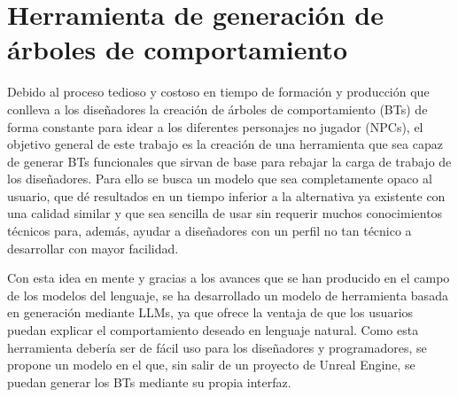 \chapter{Herramienta de generación de árboles de comportamiento}
\label{cap:descripcionTrabajo}


% 
% 
% 
% 
% 
% 

Debido al proceso tedioso y costoso en tiempo de formación y producción que conlleva a los diseñadores la creación de árboles de comportamiento (BTs) de forma constante para idear a los diferentes personajes no jugador (NPCs), el objetivo general de este trabajo es la creación de una herramienta que sea capaz de generar BTs funcionales que sirvan de base para rebajar la carga de trabajo de los diseñadores.
Para ello se busca un modelo que sea completamente opaco al usuario, que dé resultados en un tiempo inferior a la alternativa ya existente con una calidad similar y que sea sencilla de usar sin requerir muchos conocimientos técnicos para, además, ayudar a diseñadores con un perfil no tan técnico a desarrollar con mayor facilidad.

Con esta idea en mente y gracias a los avances que se han producido en el campo de los modelos del lenguaje, se ha desarrollado un modelo de herramienta basada en generación mediante LLMs, ya que ofrece la ventaja de que los usuarios puedan explicar el comportamiento deseado en lenguaje natural.
Como esta herramienta debería ser de fácil uso para los diseñadores y programadores, se propone un modelo en el que, sin salir de un proyecto de Unreal Engine, se puedan generar los BTs mediante su propia interfaz.




